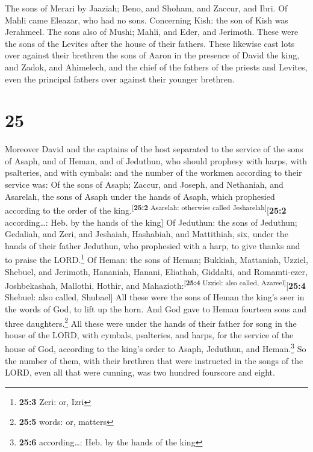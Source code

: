  The sons of Merari by Jaaziah; Beno, and Shoham, and
Zaccur, and Ibri.  Of Mahli came Eleazar, who had no
sons.  Concerning Kish: the son of Kish was Jerahmeel.
 The sons also of Mushi; Mahli, and Eder, and Jerimoth.
These were the sons of the Levites after the house of their fathers.
 These likewise cast lots over against their brethren the
sons of Aaron in the presence of David the king, and Zadok, and
Ahimelech, and the chief of the fathers of the priests and Levites, even
the principal fathers over against their younger brethren.

\hypertarget{section-24}{%
\section{25}\label{section-24}}

 Moreover David and the captains of the host separated to
the service of the sons of Asaph, and of Heman, and of Jeduthun, who
should prophesy with harps, with psalteries, and with cymbals: and the
number of the workmen according to their service was:  Of
the sons of Asaph; Zaccur, and Joseph, and Nethaniah, and Asarelah, the
sons of Asaph under the hands of Asaph, which prophesied according to
the order of the king.\textsuperscript{{[}\textbf{25:2} Asarelah:
otherwise called Jesharelah{]}}{[}\textbf{25:2} according\ldots: Heb. by
the hands of the king{]}  Of Jeduthun: the sons of
Jeduthun; Gedaliah, and Zeri, and Jeshaiah, Hashabiah, and Mattithiah,
six, under the hands of their father Jeduthun, who prophesied with a
harp, to give thanks and to praise the LORD.\footnote{\textbf{25:3}
  Zeri: or, Izri}  Of Heman: the sons of Heman; Bukkiah,
Mattaniah, Uzziel, Shebuel, and Jerimoth, Hananiah, Hanani, Eliathah,
Giddalti, and Romamti-ezer, Joshbekashah, Mallothi, Hothir, and
Mahazioth:\textsuperscript{{[}\textbf{25:4} Uzziel: also called,
Azareel{]}}{[}\textbf{25:4} Shebuel: also called, Shubael{]}
 All these were the sons of Heman the king's seer in the
words of God, to lift up the horn. And God gave to Heman fourteen sons
and three daughters.\footnote{\textbf{25:5} words: or, matters}
 All these were under the hands of their father for song
in the house of the LORD, with cymbals, psalteries, and harps, for the
service of the house of God, according to the king's order to Asaph,
Jeduthun, and Heman.\footnote{\textbf{25:6} according\ldots: Heb. by the
  hands of the king}  So the number of them, with their
brethren that were instructed in the songs of the LORD, even all that
were cunning, was two hundred fourscore and eight.

